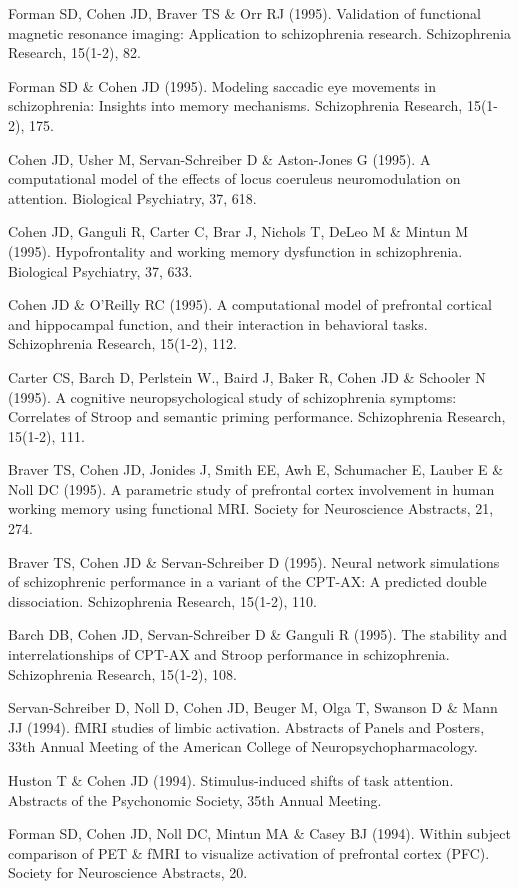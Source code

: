 \documentclass[10 pt]{article}
\begin{document}
Forman SD, Cohen JD, Braver TS \& Orr RJ (1995). Validation of functional magnetic resonance imaging: Application to schizophrenia research. Schizophrenia Research, 15(1-2), 82.

Forman SD \& Cohen JD (1995). Modeling saccadic eye movements in schizophrenia: Insights into memory mechanisms. Schizophrenia Research, 15(1-2), 175.

Cohen JD, Usher M, Servan-Schreiber D \& Aston-Jones G (1995). A computational model of the effects of locus coeruleus neuromodulation on attention. Biological Psychiatry, 37, 618.

Cohen JD, Ganguli R, Carter C, Brar J, Nichols T, DeLeo M \& Mintun M (1995). Hypofrontality and working memory dysfunction in schizophrenia. Biological Psychiatry, 37, 633.

Cohen JD \& O'Reilly RC (1995). A computational model of prefrontal cortical and hippocampal function, and their interaction in behavioral tasks. Schizophrenia Research, 15(1-2), 112.

Carter CS, Barch D, Perlstein W., Baird J, Baker R, Cohen JD \& Schooler N (1995). A cognitive neuropsychological study of schizophrenia symptoms: Correlates of Stroop and semantic priming performance. Schizophrenia Research, 15(1-2), 111.

Braver TS, Cohen JD, Jonides J, Smith EE, Awh E, Schumacher E, Lauber E \& Noll DC (1995). A parametric study of prefrontal cortex involvement in human working memory using functional MRI. Society for Neuroscience Abstracts, 21, 274.

Braver TS, Cohen JD \& Servan-Schreiber D (1995). Neural network simulations of schizophrenic performance in a variant of the CPT-AX: A predicted double dissociation. Schizophrenia Research, 15(1-2), 110.

Barch DB, Cohen JD, Servan-Schreiber D \& Ganguli R (1995). The stability and interrelationships of CPT-AX and Stroop performance in schizophrenia. Schizophrenia Research, 15(1-2), 108.

Servan-Schreiber D, Noll D, Cohen JD, Beuger M, Olga T, Swanson D \& Mann JJ (1994). fMRI studies of limbic activation. Abstracts of Panels and Posters, 33th Annual Meeting of the American College of Neuropsychopharmacology.

Huston T \& Cohen JD (1994). Stimulus-induced shifts of task attention. Abstracts of the Psychonomic Society, 35th Annual Meeting.

Forman SD, Cohen JD, Noll DC, Mintun MA \& Casey BJ (1994). Within subject comparison of PET \& fMRI to visualize activation of prefrontal cortex (PFC). Society for Neuroscience Abstracts, 20.
\end{document}

